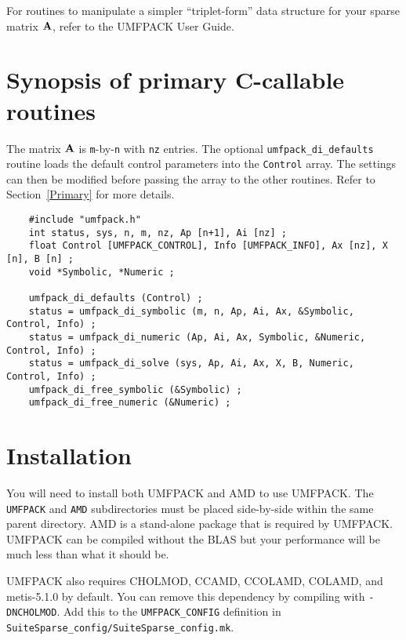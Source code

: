 \documentclass[11pt]{article}
\newcommand{\m}[1]{{\bf{#1}}}       %
\begin{document}
For routines to manipulate a simpler ``triplet-form'' data structure for your
sparse matrix $\m{A}$, refer to the UMFPACK User Guide.

\section{Synopsis of primary C-callable routines}
\label{Synopsis}

The matrix $\m{A}$ is {\tt m}-by-{\tt n} with {\tt nz} entries.
The optional {\tt umfpack\_di\_defaults} routine loads the default control
parameters into the {\tt Control} array.  The settings can then be modified
before passing the array to the other routines.  Refer to Section~\ref{Primary}
for more details.

{\footnotesize
\begin{verbatim}
    #include "umfpack.h"
    int status, sys, n, m, nz, Ap [n+1], Ai [nz] ;
    float Control [UMFPACK_CONTROL], Info [UMFPACK_INFO], Ax [nz], X [n], B [n] ;
    void *Symbolic, *Numeric ;

    umfpack_di_defaults (Control) ;
    status = umfpack_di_symbolic (m, n, Ap, Ai, Ax, &Symbolic, Control, Info) ;
    status = umfpack_di_numeric (Ap, Ai, Ax, Symbolic, &Numeric, Control, Info) ;
    status = umfpack_di_solve (sys, Ap, Ai, Ax, X, B, Numeric, Control, Info) ;
    umfpack_di_free_symbolic (&Symbolic) ;
    umfpack_di_free_numeric (&Numeric) ;
\end{verbatim}
}

\section{Installation}
\label{Install}

You will need to install both UMFPACK and AMD to use UMFPACK.
The {\tt UMFPACK} and {\tt AMD} subdirectories must be placed side-by-side
within the same parent directory.  AMD is a stand-alone package that
is required by UMFPACK.  UMFPACK can be compiled without the
BLAS
but your performance will be much less than what it should be.

UMFPACK also requires CHOLMOD, CCAMD, CCOLAMD, COLAMD, and metis-5.1.0
by default.  You can remove this dependency by compiling with
{\tt -DNCHOLMOD}.  Add this to the {\tt UMFPACK\_CONFIG} definition
in {\tt SuiteSparse\_config/SuiteSparse\_config.mk}.
\end{document}
